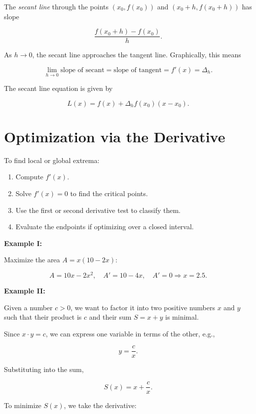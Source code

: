 The \emph{secant line} through the points \((x_0, f(x_0))\) and \((x_0 + h, f(x_0 + h))\) has slope

\[
    \frac{f(x_0 + h) - f(x_0)}{h}.
\]

As \(h \to 0\), the secant line approaches the tangent line. Graphically, this means

\[
    \lim_{h \to 0} \text{slope of secant} = \text{slope of tangent} = f'(x) = \Delta_h.
\]

The secant line equation is given by

\[
    L(x) = f(x) + \Delta_h f(x_0)(x - x_0).
\]

\section{Optimization via the Derivative}

To find local or global extrema:

\begin{enumerate}

    \item Compute \(f'(x)\).

    \item Solve \(f'(x) = 0\) to find the critical points.

    \item Use the first or second derivative test to classify them.

    \item Evaluate the endpoints if optimizing over a closed interval.

\end{enumerate}

\textbf{Example I:}

Maximize the area \(A = x(10 - 2x)\):

\[
    A = 10x - 2x^2, \quad A' = 10 - 4x, \quad A' = 0 \Rightarrow x = 2.5.
\]

\textbf{Example II:}

Given a number \( c > 0 \), we want to factor it into two positive numbers \( x \) and \( y \) such that 
their product is \( c \) and their sum \( S = x + y \) is minimal.

Since \( x \cdot y = c \), we can express one variable in terms of the other, e.g.,

\[
    y = \frac{c}{x}.
\]

Substituting into the sum,

\[
    S(x) = x + \frac{c}{x}.
\]

To minimize \( S(x) \), we take the derivative:

